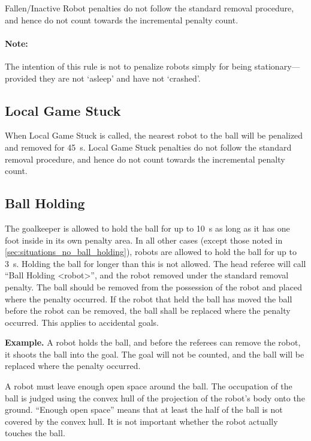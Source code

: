 Fallen/Inactive Robot penalties do not follow the standard removal procedure, and hence do not count towards the incremental penalty count.

\paragraph{Note:} The intention of this rule is not to penalize robots simply for being stationary---provided they are not `asleep' and have not `crashed'.

\subsection{Local Game Stuck}
\label{sec:pen_local_game_stuck}

When Local Game Stuck is called, the nearest robot to the ball will be penalized and removed for \qty{45}{\second}. Local Game Stuck penalties do not follow the standard removal procedure, and hence do not count towards the incremental penalty count.


\subsection{Ball Holding}
\label{sec:ball_holding}

The goalkeeper is allowed to hold the ball for up to \qty{10}{\second} as long as it has one foot inside in its own penalty area.  In all other cases (except those noted in \cref{sec:situations_no_ball_holding}), robots are allowed to hold the ball for up to \qty{3}{\second}. Holding the ball for longer than this is not allowed.
The head referee will call ``Ball Holding \textless robot\textgreater'', and the robot removed under the standard removal penalty.
The ball should be removed from the possession of the robot and placed where the penalty occurred.
If the robot that held the ball has moved the ball before the robot can be removed, the ball shall be replaced where the penalty occurred.
This applies to accidental goals.

\textbf{Example.} A robot holds the ball, and before the referees can remove the robot, it shoots the ball into the goal. The goal will not be counted, and the ball will be replaced where the penalty occurred.

A robot must leave enough open space around the ball.
The occupation of the ball is judged using the convex hull of the projection of the robot's body onto the ground. ``Enough open space'' means that at least the half of the ball is not covered by the convex hull. It is not important whether the robot actually touches the ball.

